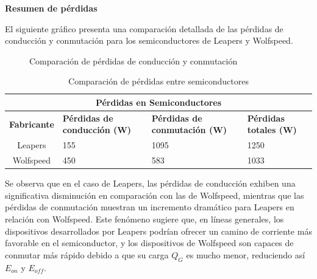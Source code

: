 \textbf{Resumen de pérdidas}

El siguiente gráfico presenta una comparación detallada de las pérdidas de conducción y conmutación para los semiconductores de Leapers y Wolfspeed.

\begin{figure}[H]
	\centering
	\caption{Comparación de pérdidas de conducción y conmutación}
	\label{fig:loss_comparison}
\end{figure}

\begin{table}[H]
	\centering
	\begin{tabular}{|c|p{3.5cm}|p{3.5cm}|p{3.5cm}|}
		\hline
		\multicolumn{4}{|c|}{\textbf{Pérdidas en Semiconductores}} \\
		\hline
		\textbf{Fabricante} & \textbf{Pérdidas de conducción (W)} & \textbf{Pérdidas de conmutación (W)} & \textbf{Pérdidas totales (W)} \\
		\hline
		Leapers & 155 & 1095 & 1250 \\
		\hline
		Wolfspeed & 450 & 583 & 1033 \\
		\hline
	\end{tabular}
	\caption{Comparación de pérdidas entre semiconductores}
\end{table}

Se observa que en el caso de Leapers, las pérdidas de conducción exhiben una significativa disminución en comparación con las de Wolfspeed, mientras que las pérdidas de conmutación muestran un incremento dramático para Leapers en relación con Wolfspeed. Este fenómeno sugiere que, en líneas generales, los dispositivos desarrollados por Leapers podrían ofrecer un camino de corriente más favorable en el semiconductor, y los dispositivos de Wolfspeed son capaces de conmutar más rápido debido a que su carga $Q_G$ es mucho menor, reduciendo así $E_{on}$ y $E_{off}$.

